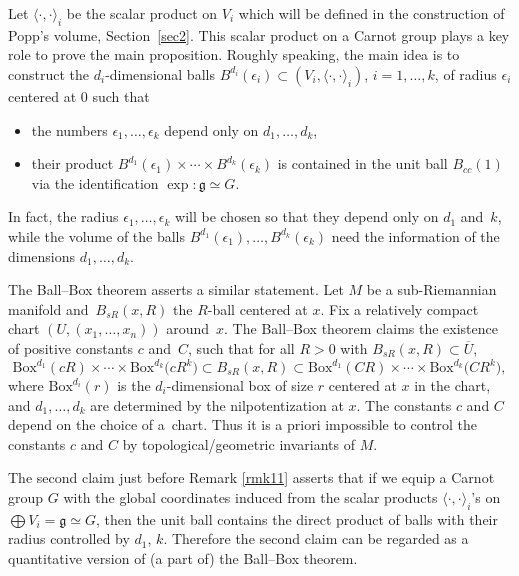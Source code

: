 \documentclass[pdftex]{sigma}
\numberwithin{equation}{section}
\newcommand{\g}{\mathfrak{g}}
\begin{document}
Let $\langle\cdot,\cdot\rangle_i$ be the scalar product on $V_i$ which will be defined in the construction of Popp's volume,
Section~\ref{sec2}.
This scalar product on a Carnot group plays a key role to prove the main proposition.
Roughly speaking,
the main idea is to construct the $d_i$-dimensional balls $B^{d_i}(\epsilon_i)\subset (V_i,\langle\cdot,\cdot\rangle_i)$, $i=1,\dots,k$, of radius $\epsilon_i$ centered at $0$ such that
\begin{itemize}\itemsep=0pt
 \item[$1)$] the numbers $\epsilon_1,\dots,\epsilon_k$ depend only on $d_1,\dots,d_k$,
 \item[$2)$] their product $B^{d_1}(\epsilon_1)\times{}\cdots {}\times B^{d_k}(\epsilon_k)$
 is contained in the unit ball $B_{cc}(1)$ via the identification $\exp\colon \g\simeq G$.
\end{itemize}

\begin{Remark}\label{rmk11}
 In fact,
 the radius $\epsilon_1,\dots,\epsilon_k$ will be chosen so that they depend only on $d_1$ and~$k$,
 while the volume of the balls $B^{d_1}(\epsilon_1),\dots,B^{d_k}(\epsilon_k)$ need the information of the dimensions $d_1,\dots,d_k$.
\end{Remark}

The Ball--Box theorem asserts a similar statement.
Let $M$ be a sub-Riemannian manifold and~$B_{sR}(x,R)$
the $R$-ball centered at $x$.
Fix a relatively compact chart $(U,(x_1,\dots,x_n))$ around~$x$.
The Ball--Box theorem claims the existence of positive constants $c$ and~$C$,
such that for all $R>0$ with $B_{sR}(x,R)\subset \overline{U}$,
\[
\mathrm{Box}^{d_1}(cR)\times \cdots\times \mathrm{Box}^{d_k}\big(cR^k\big)\subset B_{sR}(x,R)\subset \mathrm{Box}^{d_1}(CR)\times\cdots \times \mathrm{Box}^{d_k}\big(CR^k\big),
\]
where $\mathrm{Box}^{d_i}(r)$ is the $d_i$-dimensional box of size $r$ centered at $x$ in the chart,
and $d_1,\dots,d_k$ are determined by the nilpotentization at $x$.
The constants $c$ and $C$ depend on the choice of a~chart.
Thus it is a priori impossible to control the constants $c$ and $C$ by topological/geometric invariants of $M$.

The second claim just before Remark \ref{rmk11} asserts that if we equip a Carnot group $G$ with the global coordinates induced from the scalar products $\langle\cdot,\cdot\rangle_i$'s on $\bigoplus V_i=\g\simeq G$,
then the unit ball contains the direct product of balls with their radius controlled by $d_1$, $k$.
Therefore the second claim can be regarded as a quantitative version of (a part of) the Ball--Box theorem.
\end{document}
